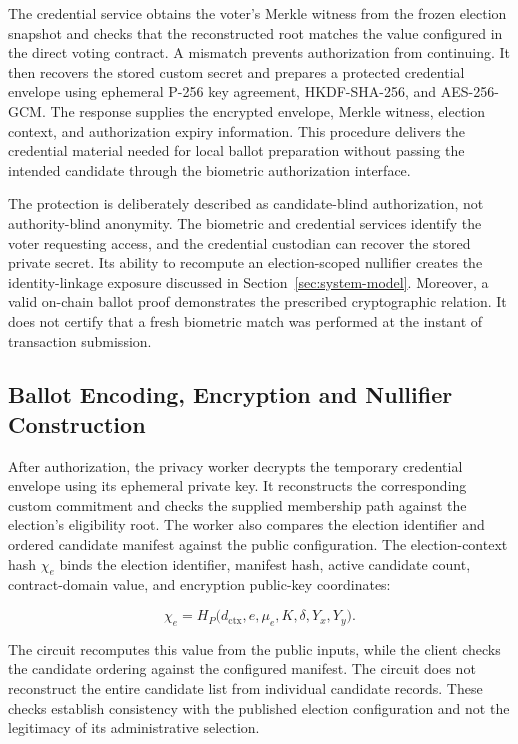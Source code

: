 The credential service obtains the voter's Merkle witness from the frozen
election snapshot and checks that the reconstructed root matches the
value configured in the direct voting contract. A mismatch prevents
authorization from continuing. It then recovers the stored custom secret
and prepares a protected credential envelope using ephemeral P-256 key
agreement, HKDF-SHA-256, and AES-256-GCM. The response supplies the
encrypted envelope, Merkle witness, election context, and authorization
expiry information. This procedure delivers the credential material
needed for local ballot preparation without passing the intended
candidate through the biometric authorization interface.

The protection is deliberately described as candidate-blind authorization,
not authority-blind anonymity. The biometric and credential services
identify the voter requesting access, and the credential custodian can
recover the stored private secret. Its ability to recompute an
election-scoped nullifier creates the identity-linkage exposure discussed
in Section~\ref{sec:system-model}. Moreover, a valid on-chain ballot
proof demonstrates the prescribed cryptographic relation. It does not
certify that a fresh biometric match was performed at the instant of
transaction submission.

\subsection{Ballot Encoding, Encryption and Nullifier Construction}
\label{subsec:architecture-ballot-submission}
\label{subsec:protocol-encryption}

After authorization, the privacy worker decrypts the temporary credential
envelope using its ephemeral private key. It reconstructs the corresponding
custom commitment and checks the supplied membership path against the
election's eligibility root. The worker also compares the election
identifier and ordered candidate manifest against the public configuration.
The election-context hash $\chi_e$ binds the election identifier, manifest
hash, active candidate count, contract-domain value, and encryption
public-key coordinates:

\begin{equation}
\label{eq:protocol-context}
\chi_e=H_P\bigl(
 d_{\mathrm{ctx}},e,\mu_e,K,\delta,Y_x,Y_y
\bigr).
\end{equation}

The circuit recomputes this value from the public inputs, while the client
checks the candidate ordering against the configured manifest. The circuit
does not reconstruct the entire candidate list from individual candidate
records. These checks establish consistency with the published election
configuration and not the legitimacy of its administrative selection.

